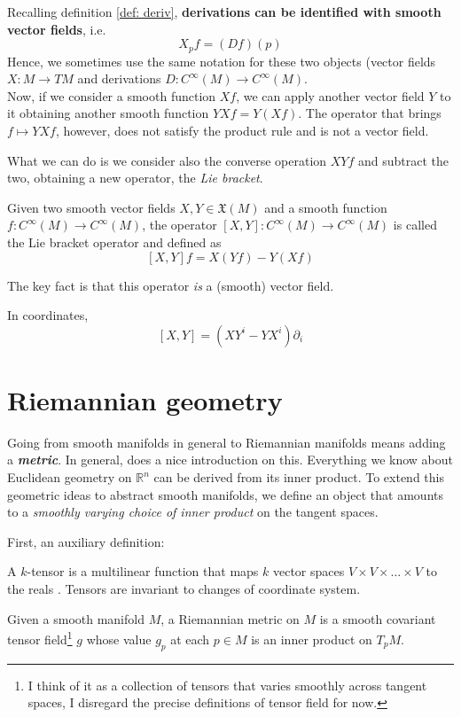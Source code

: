 \documentclass[a4paper,12pt,reqno]{amsbook}
\theoremstyle{definition} %
\newcommand{\1}{\mathbbm{1}}
\theoremstyle{plain}
\theoremstyle{remark}
\begin{document}
Recalling definition \ref{def: deriv}, \textbf{derivations can be identified with smooth vector fields}, i.e. 
\[ X_pf = (Df)(p)
\]Hence, we sometimes use the same notation for these two objects (vector fields $X:M \to TM$ and derivations $D:C^\infty(M) \to C^\infty(M)$.
\\

Now, if we consider a smooth function $Xf$, we can apply another vector field $Y$ to it obtaining another smooth function $YXf = Y(Xf)$. The operator that brings $f \mapsto YXf$, however, does not satisfy the product rule and is not a vector field. 

What we can do is we consider also the converse operation $XYf$ and subtract the two, obtaining a new operator, the \textit{Lie bracket}.

\begin{definition}
    Given two smooth vector fields $X,Y \in \mathfrak{X}(M)$ and a smooth function $f: C^\infty(M) \to C^\infty(M)$, the operator $[X,Y]: C^\infty(M) \to C^\infty(M)$ is called the Lie bracket operator and defined as
    \[
    [X,Y]f = X(Yf) - Y(Xf)
    \]
\end{definition}

The key fact is that this operator \textit{is} a (smooth) vector field.

In coordinates, 
\[
[X,Y] = (XY^i - YX^i) \partial_i
\]

\newpage
\chapter{Riemannian geometry}\label{sec: Mgd}

Going from smooth manifolds in general to Riemannian manifolds means adding a \emph{\textbf{metric}}. In general, \cite{lee2018riemann} does a nice introduction on this. Everything we know about Euclidean geometry on $\mathbb{R}^n$ can be derived from its inner product. To extend this geometric ideas to abstract smooth manifolds, we define an object that amounts to a \emph{smoothly varying choice of inner product} on the tangent spaces.

First, an auxiliary definition:
\begin{definition}[Tensor]
    A $k$-tensor is a multilinear function that maps $k$ vector spaces $V\times V \times \ldots \times V$ to the reals \cite{spivak2018calculus}. Tensors are invariant to changes of coordinate system. 
\end{definition}
\begin{definition}
    Given a smooth manifold $M$, a Riemannian metric on $M$ is a smooth covariant tensor field\footnote{I think of it as a collection of tensors that varies smoothly across tangent spaces, I disregard the precise definitions of tensor field for now.}  $g$ whose value $g_p$ at each $p \in M$ is an inner product on $T_pM$. 
\end{definition}
\end{document}
